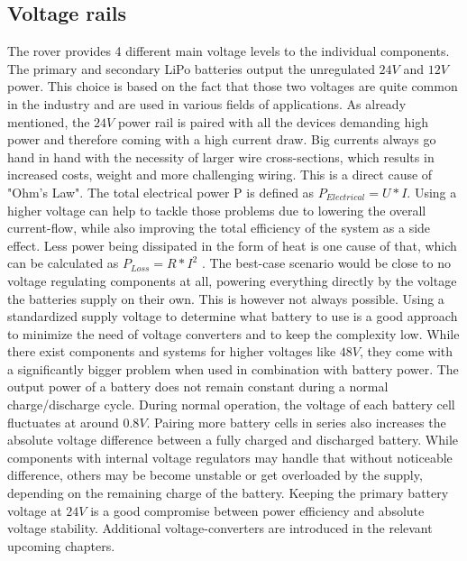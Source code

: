     \clearpage %

    \subsection{Voltage rails}

    The rover provides 4 different main voltage levels to the individual components. The primary and secondary LiPo batteries output the unregulated $24V$ and $12V$ power. This choice is based on the fact that those two voltages are quite common in the industry and are used in various fields of applications. As already mentioned, the $24V$ power rail is paired with all the devices demanding high power and therefore coming with a high current draw. Big currents always go hand in hand with the necessity of larger wire cross-sections, which results in increased costs, weight and more challenging wiring. This is a direct cause of "Ohm's Law". The total electrical power P is defined as $P_{Electrical}=U*I$. Using a higher voltage can help to tackle those problems due to lowering the overall current-flow, while also improving the total efficiency of the system as a side effect. Less power being dissipated in the form of heat is one cause of that, which can be calculated as $P_{Loss}=R*I^2$ . The best-case scenario would be close to no voltage regulating components at all, powering everything directly by the voltage the batteries supply on their own. This is however not always possible. Using a standardized supply voltage to determine what battery to use is a good approach to minimize the need of voltage converters and to keep the complexity low. While there exist components and systems for higher voltages like $48V$, they come with a significantly bigger problem when used in combination with battery power. The output power of a battery does not remain constant during a normal charge/discharge cycle. During normal operation, the voltage of each battery cell fluctuates at around $0.8V$. Pairing more battery cells in series also increases the absolute voltage difference between a fully charged and discharged battery. While components with internal voltage regulators may handle that without noticeable difference, others may be become unstable or get overloaded by the supply, depending on the remaining charge of the battery. Keeping the primary battery voltage at $24V$ is a good compromise between power efficiency and absolute voltage stability. Additional voltage-converters are introduced in the relevant upcoming chapters.

    \vspace{5mm} %

